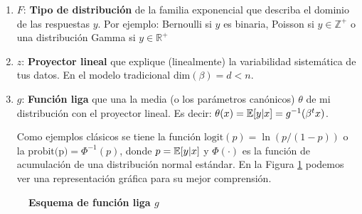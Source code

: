 \documentclass[../Main/Main.tex]{subfiles}
\begin{document}
\begin{enumerate}
	\item $F$: \textbf{Tipo de distribución} de la familia exponencial que describa el dominio de las respuestas $y$. Por ejemplo: Bernoulli si $y$ es binaria, Poisson si $y \in \mathbb{Z}^+$ o una distribución Gamma si $y \in \mathbb{R}^+$
	\item $z$: \textbf{Proyector lineal} que explique (linealmente) la variabilidad sistemática de tus datos. En el modelo tradicional $\text{dim}(\beta) = d < n.$
	\item $g$: \textbf{Función liga} que una la media (o los parámetros canónicos) $\theta$ de mi distribución con el proyector lineal. Es decir: $\theta(x) = \mathbb{E}[y|x] = g^{-1}(\beta^tx)$. 
	
	Como ejemplos clásicos se tiene la función $\text{logit}(p) = \ln(p/(1-p))$ o la $\text{probit(p)} = \Phi^{-1}(p)$, donde $p = \mathbb{E}[y|x]$ y $\Phi(\cdot)$ es la función de acumulación de una distribución normal estándar. En la Figura \ref{fig:DiagramaFuncLiga} podemos ver una representación gráfica para su mejor comprensión.
\end{enumerate}

\begin{figure}[h]
\centering
{}
\caption{\textbf{Esquema de función liga $g$}}
\label{fig:DiagramaFuncLiga}
\end{figure}
\end{document}
